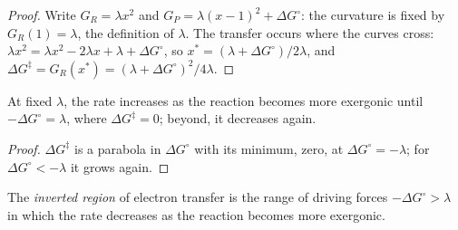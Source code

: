 \begin{proof}
Write $G_R = \lambda x^2$ and $G_P = \lambda(x - 1)^2 + \Delta G^\circ$: the curvature is fixed by $G_R(1) = \lambda$, the
definition of $\lambda$. The transfer occurs where the curves cross: $\lambda x^2 = \lambda x^2 - 2\lambda x + \lambda +
\Delta G^\circ$, so $x^\ast = (\lambda + \Delta G^\circ)/2\lambda$, and $\Delta G^{\ddagger} = G_R(x^\ast) = (\lambda + \Delta G^\circ)^2/4\lambda$.
\end{proof}

\begin{corollary}\label{cor:b3:complex-mechanisms:inverted}
At fixed $\lambda$, the rate increases as the reaction becomes more exergonic until
$-\Delta G^\circ = \lambda$, where $\Delta G^{\ddagger} = 0$; beyond, it decreases again.
\end{corollary}

\begin{proof}
$\Delta G^{\ddagger}$ is a parabola in $\Delta G^\circ$ with its minimum, zero, at $\Delta G^\circ = -\lambda$; for $\Delta G^\circ < -\lambda$ it grows
again.
\end{proof}

\begin{definition}\label{def:b3:complex-mechanisms:inverted}
The \emph{inverted region} of electron transfer is the
range of driving forces $-\Delta G^\circ > \lambda$ in which the rate decreases as the reaction becomes
more exergonic.
\end{definition}

